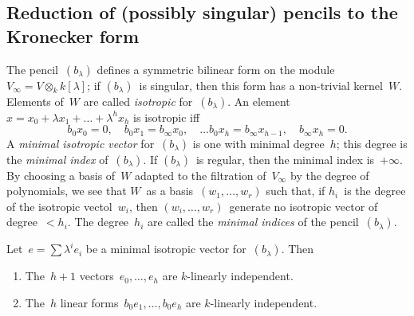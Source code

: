\documentclass{lms}%
\begin{document}
\subsection{Reduction of (possibly singular) pencils to the Kronecker form} %
The pencil~$(b_{λ})$ defines a symmetric bilinear form on the
module~$V_{∞} = V ⊗_{k} k[λ]$; if $(b_{λ})$~is singular, then this form
has a non-trivial kernel~$W$. Elements of~$W$ are called \emph{isotropic}
for~$(b_{λ})$. An element~$x = x_0 + λ x_1 + … + λ^h x_h$ is isotropic iff
\begin{equation}\label{eq:isotropic}
b_0 x_0 = 0, \quad
b_0 x_1 = b_{∞} x_0, \quad …
b_0 x_h = b_{∞} x_{h-1}, \quad
b_{∞} x_{h} = 0.
\end{equation}
A \emph{minimal isotropic vector} for~$(b_{λ})$ is one with minimal
degree~$h$; this degree is the \emph{minimal index} of~$(b_{λ})$. If
$(b_{λ})$~is regular, then the minimal index is~$+∞$.
By choosing a basis of~$W$
adapted to the filtration of~$V_{∞}$ by the degree of polynomials, we see
that $W$~as a basis~$(w_1,…,w_r)$ such that, if $h_i$~is the degree of
the isotropic vectol~$w_i$, then $(w_i,…,w_r)$~generate no isotropic
vector of degree~$< h_i$. The degree~$h_i$ are called the \emph{minimal
indices} of the pencil~$(b_{λ})$.
\begin{prop}\label{prop:minimal-indep}%
Let~$e = ∑ λ^i e_i$ be a minimal isotropic vector for~$(b_{λ})$. Then
\begin{enumerate}
\item The~$h+1$ vectors~$e_0, …, e_h$ are $k$-linearly independent.
\item The~$h$ linear forms~$b_{0} e_1, …, b_{0} e_h$ are $k$-linearly
independent.
\end{enumerate}
\end{prop}
\end{document}
